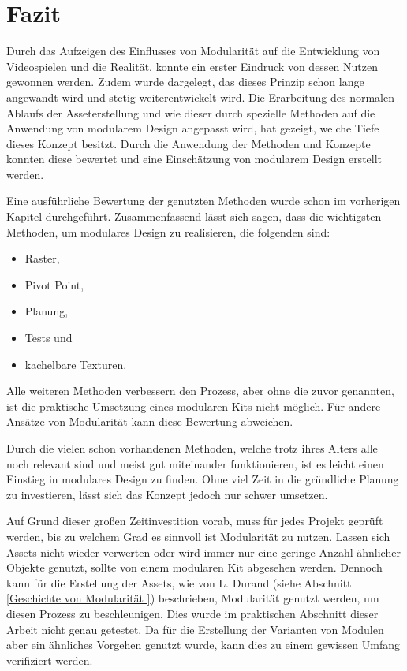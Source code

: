 \section{Fazit}
Durch das Aufzeigen des Einflusses von Modularität auf die Entwicklung von Videospielen und die Realität, konnte ein erster Eindruck von dessen Nutzen gewonnen werden. Zudem wurde dargelegt, das dieses Prinzip schon lange angewandt wird und stetig weiterentwickelt wird. Die Erarbeitung des normalen Ablaufs der Asseterstellung und wie dieser durch spezielle Methoden auf die Anwendung von modularem Design angepasst wird, hat gezeigt, welche Tiefe dieses Konzept besitzt. Durch die Anwendung der Methoden und Konzepte konnten diese bewertet und eine Einschätzung von modularem Design erstellt werden.
\par
Eine ausführliche Bewertung der genutzten Methoden wurde schon im vorherigen Kapitel durchgeführt. Zusammenfassend lässt sich sagen, dass die wichtigsten Methoden, um modulares Design zu realisieren, die folgenden sind:
\begin{itemize}
\item Raster,
\item Pivot Point,
\item Planung,
\item Tests und
\item kachelbare Texturen.
\end{itemize}
Alle weiteren Methoden verbessern den Prozess, aber ohne die zuvor genannten, ist die praktische Umsetzung eines modularen Kits nicht möglich. Für andere Ansätze von Modularität kann diese Bewertung abweichen.
\par
Durch die vielen schon vorhandenen Methoden, welche trotz ihres Alters alle noch relevant sind und meist gut miteinander funktionieren, ist es leicht einen Einstieg in modulares Design zu finden. Ohne viel Zeit in die gründliche Planung zu investieren, lässt sich das Konzept jedoch nur schwer umsetzen.
\par
Auf Grund dieser großen Zeitinvestition vorab, muss für jedes Projekt geprüft werden, bis zu welchem Grad es sinnvoll ist Modularität zu nutzen. Lassen sich Assets nicht wieder verwerten oder wird immer nur eine geringe Anzahl ähnlicher Objekte genutzt, sollte von einem modularen Kit abgesehen werden. Dennoch kann für die Erstellung der Assets, wie von L. Durand (siehe Abschnitt \ref{Geschichte von Modularität }) beschrieben, Modularität genutzt werden, um diesen Prozess zu beschleunigen. Dies wurde im praktischen Abschnitt dieser Arbeit nicht genau getestet. Da für die Erstellung der Varianten von Modulen aber ein ähnliches Vorgehen genutzt wurde, kann dies zu einem gewissen Umfang verifiziert werden.

